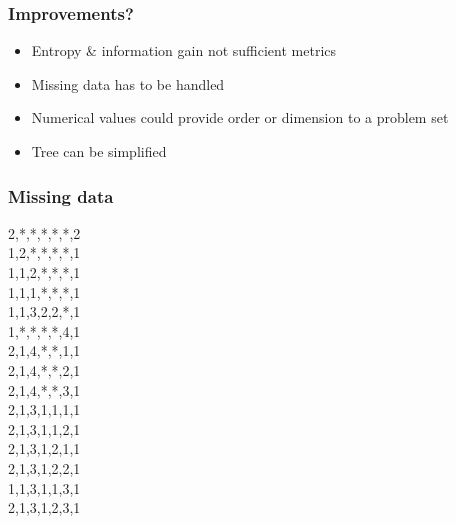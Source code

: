 \begin{frame}
\frametitle{Improvements?}
\begin{itemize}
\item Entropy \& information gain not sufficient metrics
\vfill
\item Missing data has to be handled
\vfill
\item Numerical values could provide order or dimension to a problem set
\vfill
\item Tree can be simplified
\end{itemize}
\end{frame}

\begin{frame}[allowframebreaks]
\frametitle{Missing data}
\begin{center}

2,*,*,*,*,*,2\\
1,2,*,*,*,*,1\\
1,1,2,*,*,*,1\\
1,1,1,*,*,*,1\\
1,1,3,2,2,*,1\\
1,*,*,*,*,4,1\\
2,1,4,*,*,1,1\\
2,1,4,*,*,2,1\\
2,1,4,*,*,3,1\\
2,1,3,1,1,1,1\\
2,1,3,1,1,2,1\\
2,1,3,1,2,1,1\\
2,1,3,1,2,2,1\\
1,1,3,1,1,3,1\\
2,1,3,1,2,3,1
\end{center}


\end{frame}

